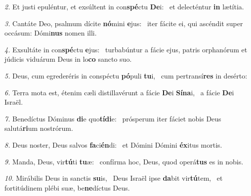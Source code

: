 \begin{psalmus}
\textit{\color{red}2.} Et justi epuléntur, et exsúltent in con\textbf{spé}ctu \textbf{De}i:~\grestar{}
et delecténtur \textbf{in} lætítia.~\Abardot{}

\textit{\color{red}3.} Cantáte Deo, psalmum dícite \textbf{nó}mini \textbf{e}jus:~\grestar{}
iter fácite ei, qui ascéndit super occásum: Dómi\textbf{nus} nomen illi.~\Abardot{}

\textit{\color{red}4.} Exsultáte in con\textbf{spé}ctu \textbf{e}jus:~\grestar{}
turbabúntur a fácie ejus, patris orphanórum et júdicis viduárum Deus in lo\textbf{co} sancto suo.~\Abardot{}

\textit{\color{red}5.} Deus, cum egrederéris in conspéctu \textbf{pó}puli \textbf{tu}i,~\grestar{}
cum pertransí\textbf{res} in desérto:~\Abardot{}

\textit{\color{red}6.} Terra mota est, étenim cæli distillavérunt a fácie \textbf{De}i \textbf{Sí}\textbf{na}i,~\grestar{}
a fácie \textbf{De}i Israël.~\Abardot{}

\textit{\color{red}7.} Benedíctus Dóminus \textbf{di}e quo\textbf{tí}\textbf{di}e:~\grestar{}
prósperum iter fáciet nobis Deus salutá\textbf{ri}um nostrórum.~\Abardot{}

\textit{\color{red}8.} Deus noster, Deus salvos \textbf{fa}ci\textbf{én}di:~\grestar{}
et Dómini Dómini \textbf{éx}itus mortis.~\Abardot{}

\textit{\color{red}9.} Manda, Deus, vir\textbf{tú}ti \textbf{tu}æ:~\grestar{}
confírma hoc, Deus, quod operá\textbf{tus} es in nobis.~\Abardot{}

\textit{\color{red}10.} Mirábilis Deus in sanctis \textbf{su}is,~\gredagger{}
Deus Israël ipse \textbf{da}bit vir\textbf{tú}tem,~\grestar{}
et fortitúdinem plébi suæ, be\textbf{ne}díctus Deus.~\Abardot{}
\end{psalmus}
